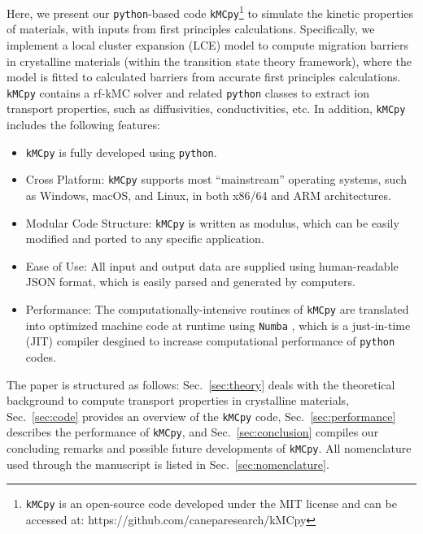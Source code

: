 \documentclass[a4paper,fleqn]{cas-dc}
\begin{document}
Here, we present our \texttt{python}-based code \texttt{kMCpy}\footnote{\texttt{kMCpy} is an open-source code developed under the MIT license and can be accessed at: https://github.com/caneparesearch/kMCpy\label{fn:github}} to simulate the kinetic properties of materials, with inputs from first principles calculations. Specifically, we implement a local cluster expansion (LCE) model\cite{van_der_ven_first-principles_2001,van_der_ven_rechargeable_2020} to compute migration barriers in crystalline materials (within the transition state theory framework), where the model is fitted to calculated barriers from accurate first principles calculations. \texttt{kMCpy} contains a rf-kMC solver and related \texttt{python} classes to extract ion transport properties, such as diffusivities, conductivities, etc. In addition, \texttt{kMCpy} includes the following features:
\begin{itemize}
    \item \texttt{kMCpy} is fully developed using \texttt{python}\cite{perez_python_2011,noauthor_top_2022}.
    \item Cross Platform: \texttt{kMCpy} supports most ``mainstream'' operating systems, such as Windows, macOS, and Linux, in both x86/64 and ARM architectures.
    \item Modular Code Structure: \texttt{kMCpy} is written as modulus, which can be easily modified and ported to any specific application. 
    \item Ease of Use: All input and output data are supplied using human-readable JSON format, which is easily parsed and generated by computers.
    \item Performance: The computationally-intensive routines  of \texttt{kMCpy} are translated into optimized machine code at runtime using \texttt{Numba} \cite{lam_numba_2015}, which is a just-in-time (JIT) compiler desgined to  increase computational performance of \texttt{python} codes.
\end{itemize}

The paper is structured as follows: Sec.~{\ref{sec:theory}} deals with the theoretical background to compute transport properties in crystalline materials, Sec.~{\ref{sec:code}} provides an overview of the \texttt{kMCpy} code,  Sec.~\ref{sec:performance} describes the performance of \texttt{kMCpy}, and Sec.~{\ref{sec:conclusion}} compiles our concluding remarks and possible future developments of \texttt{kMCpy}. All nomenclature used through the manuscript is listed in Sec.~\ref{sec:nomenclature}.  
\end{document}
